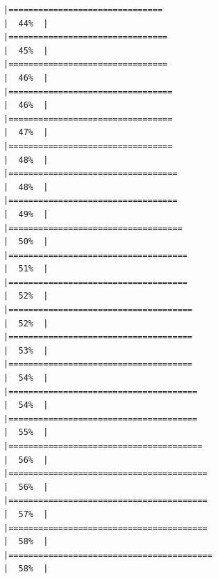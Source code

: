 \documentclass[
]{book}
\begin{document}
\begin{verbatim}
|===============================                                       |  44%  |                                                                              |================================                                      |  45%  |                                                                              |================================                                      |  46%  |                                                                              |=================================                                     |  46%  |                                                                              |=================================                                     |  47%  |                                                                              |=================================                                     |  48%  |                                                                              |==================================                                    |  48%  |                                                                              |==================================                                    |  49%  |                                                                              |===================================                                   |  50%  |                                                                              |====================================                                  |  51%  |                                                                              |====================================                                  |  52%  |                                                                              |=====================================                                 |  52%  |                                                                              |=====================================                                 |  53%  |                                                                              |=====================================                                 |  54%  |                                                                              |======================================                                |  54%  |                                                                              |======================================                                |  55%  |                                                                              |=======================================                               |  56%  |                                                                              |========================================                              |  56%  |                                                                              |========================================                              |  57%  |                                                                              |========================================                              |  58%  |                                                                              |=========================================                             |  58%  |                                                                              
\end{verbatim}
\end{document}
